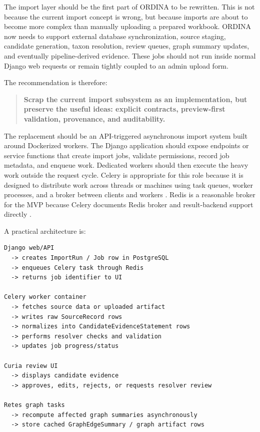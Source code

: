 \documentclass[11pt,a4paper]{article}
\begin{document}
The import layer should be the first part of ORDINA to be rewritten. This is not because the current import concept is wrong, but because imports are about to become more complex than manually uploading a prepared workbook. ORDINA now needs to support external database synchronization, source staging, candidate generation, taxon resolution, review queues, graph summary updates, and eventually pipeline-derived evidence. These jobs should not run inside normal Django web requests or remain tightly coupled to an admin upload form.

The recommendation is therefore:

\begin{quote}
\textbf{Scrap the current import subsystem as an implementation, but preserve the useful ideas: explicit contracts, preview-first validation, provenance, and auditability.}
\end{quote}

The replacement should be an API-triggered asynchronous import system built around Dockerized workers. The Django application should expose endpoints or service functions that create import jobs, validate permissions, record job metadata, and enqueue work. Dedicated workers should then execute the heavy work outside the request cycle. Celery is appropriate for this role because it is designed to distribute work across threads or machines using task queues, worker processes, and a broker between clients and workers \cite{celery-intro}. Redis is a reasonable broker for the MVP because Celery documents Redis broker and result-backend support directly \cite{celery-redis}.

A practical architecture is:

\begin{verbatim}
Django web/API
  -> creates ImportRun / Job row in PostgreSQL
  -> enqueues Celery task through Redis
  -> returns job identifier to UI

Celery worker container
  -> fetches source data or uploaded artifact
  -> writes raw SourceRecord rows
  -> normalizes into CandidateEvidenceStatement rows
  -> performs resolver checks and validation
  -> updates job progress/status

Curia review UI
  -> displays candidate evidence
  -> approves, edits, rejects, or requests resolver review

Retes graph tasks
  -> recompute affected graph summaries asynchronously
  -> store cached GraphEdgeSummary / graph artifact rows
\end{verbatim}
\end{document}

